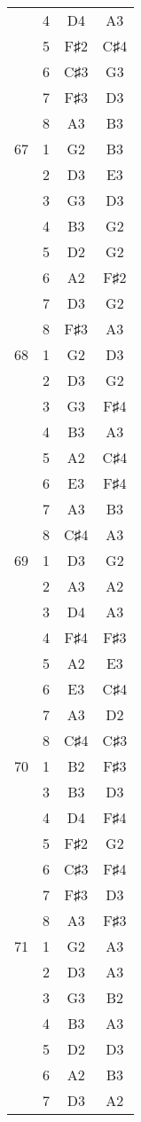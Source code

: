 \documentclass{article}
\begin{document}
\begin{longtable}{|c|c|c|c|}
  & 4 & D4 & A3 \\ 
  & 5 & F♯2 & C♯4 \\ 
  & 6 & C♯3 & G3 \\ 
  & 7 & F♯3 & D3 \\ 
  & 8 & A3 & B3 \\ 
\hline
67 & 1 & G2 & B3 \\ 
  & 2 & D3 & E3 \\ 
  & 3 & G3 & D3 \\ 
  & 4 & B3 & G2 \\ 
  & 5 & D2 & G2 \\ 
  & 6 & A2 & F♯2 \\ 
  & 7 & D3 & G2 \\ 
  & 8 & F♯3 & A3 \\ 
\hline
68 & 1 & G2 & D3 \\ 
  & 2 & D3 & G2 \\ 
  & 3 & G3 & F♯4 \\ 
  & 4 & B3 & A3 \\ 
  & 5 & A2 & C♯4 \\ 
  & 6 & E3 & F♯4 \\ 
  & 7 & A3 & B3 \\ 
  & 8 & C♯4 & A3 \\ 
\hline
69 & 1 & D3 & G2 \\ 
  & 2 & A3 & A2 \\ 
  & 3 & D4 & A3 \\ 
  & 4 & F♯4 & F♯3 \\ 
  & 5 & A2 & E3 \\ 
  & 6 & E3 & C♯4 \\ 
  & 7 & A3 & D2 \\ 
  & 8 & C♯4 & C♯3 \\ 
\hline
70 & 1 & B2 & F♯3 \\ 
  & 3 & B3 & D3 \\ 
  & 4 & D4 & F♯4 \\ 
  & 5 & F♯2 & G2 \\ 
  & 6 & C♯3 & F♯4 \\ 
  & 7 & F♯3 & D3 \\ 
  & 8 & A3 & F♯3 \\ 
\hline
71 & 1 & G2 & A3 \\ 
  & 2 & D3 & A3 \\ 
  & 3 & G3 & B2 \\ 
  & 4 & B3 & A3 \\ 
  & 5 & D2 & D3 \\ 
  & 6 & A2 & B3 \\ 
  & 7 & D3 & A2 \\ 

\end{longtable}
\end{document}
